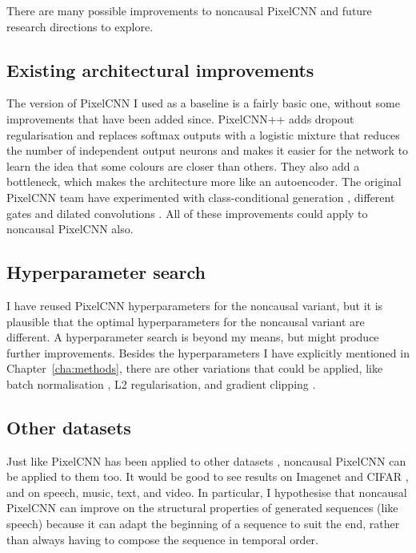 \documentclass[11pt, a4paper, openany]{book}
\begin{document}
There are many possible improvements to noncausal PixelCNN and future research directions to explore.

\subsection{Existing architectural improvements}

The version of PixelCNN I used as a baseline is a fairly basic one, without some improvements that have been added since. PixelCNN++ \citep{pixelcnn++} adds dropout regularisation and replaces softmax outputs with a logistic mixture that reduces the number of independent output neurons and makes it easier for the network to learn the idea that some colours are closer than others. They also add a bottleneck, which makes the architecture more like an autoencoder. The original PixelCNN team have experimented with class-conditional generation \citep{pixelcnn2}, different gates \citep{videopixel} and dilated convolutions \citep{wavenet}. All of these improvements could apply to noncausal PixelCNN also.

\subsection{Hyperparameter search}

I have reused PixelCNN hyperparameters for the noncausal variant, but it is plausible that the optimal hyperparameters for the noncausal variant are different. A hyperparameter search is beyond my means, but might produce further improvements. Besides the hyperparameters I have explicitly mentioned in Chapter~\ref{cha:methods}, there are other variations that could be applied, like batch normalisation \citep{batchnormalisation}, L2 regularisation, and gradient clipping \citep{gradientclipping}.

\subsection{Other datasets}

Just like PixelCNN has been applied to other datasets \citep{pixelcnn2,wavenet,bytenet,videopixel}, noncausal PixelCNN can be applied to them too. It would be good to see results on Imagenet \citep{imagenet} and CIFAR \citep{cifar}, and on speech, music, text, and video. In particular, I hypothesise that noncausal PixelCNN can improve on the structural properties of generated sequences (like speech) because it can adapt the beginning of a sequence to suit the end, rather than always having to compose the sequence in temporal order.
\end{document}
